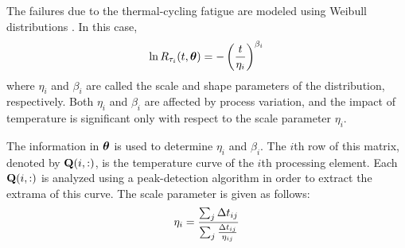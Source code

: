The failures due to the thermal-cycling fatigue are modeled using Weibull distributions \cite{ukhov2012, xiang2010}.
In this case,
\[
  \ln R_{\tau_i}(t, \bm{\theta}) = -\left( \frac{t}{\eta_i} \right)^{\beta_i}
\]
where $\eta_i$ and $\beta_i$ are called the scale and shape parameters of the distribution, respectively.
Both $\eta_i$ and $\beta_i$ are affected by process variation, and the impact of temperature is significant only with respect to the scale parameter $\eta_i$.

The information in $\bm{\theta}$ is used to determine $\eta_i$ and $\beta_i$.
The $i$th row of this matrix, denoted by $\mathbf{Q}(i, :)$, is the temperature curve of the $i$th processing element.
Each $\mathbf{Q}(i, :)$ is analyzed using a peak-detection algorithm in order to extract the extrama of this curve.
The scale parameter is given as follows:
\[
  \eta_i = \frac{\sum_j \Delta t_{ij}}{\sum_j\frac{ \Delta t_{ij}}{\eta_{ij}}}
\]
